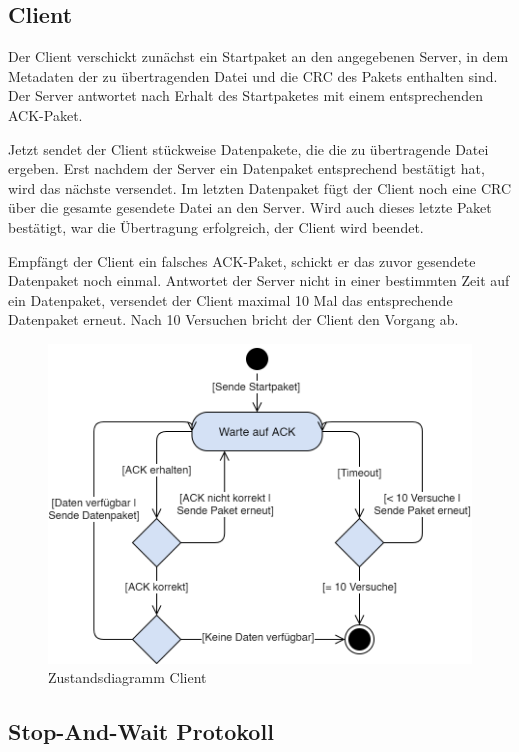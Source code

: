 \documentclass{article}
\begin{document}
		\subsection{Client}
		
		Der Client verschickt zunächst ein Startpaket an den angegebenen Server, in dem Metadaten der zu übertragenden Datei und die CRC des Pakets enthalten sind. Der Server antwortet nach Erhalt des Startpaketes mit einem entsprechenden ACK-Paket.

		Jetzt sendet der Client stückweise Datenpakete, die die zu übertragende Datei ergeben. Erst nachdem der Server ein Datenpaket entsprechend bestätigt hat, wird das nächste versendet. Im letzten Datenpaket fügt der Client noch eine CRC über die gesamte gesendete Datei an den Server. Wird auch dieses letzte Paket bestätigt, war die Übertragung erfolgreich, der Client wird beendet.

		Empfängt der Client ein falsches ACK-Paket, schickt er das zuvor gesendete Datenpaket noch einmal. Antwortet der Server nicht in einer bestimmten Zeit auf ein Datenpaket, versendet der Client maximal 10 Mal das entsprechende Datenpaket erneut. Nach 10 Versuchen bricht der Client den Vorgang ab.

		\begin{figure}[!htb]
			\centering
			\includegraphics[scale=0.3]{zustandsdiagramm_client.png}
			\caption{Zustandsdiagramm Client}
		\end{figure}

		\subsection{Stop-And-Wait Protokoll}
\end{document}
